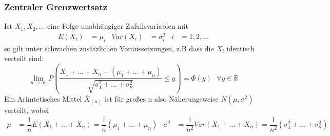 \documentclass[
	ngerman,
	accentcolor=9c,%
	type=intern,
	marginpar=false
	]{tudapub}
\begin{document}
            \subsubsection{Zentraler Grenzwertsatz}
                \begin{satz}
                    Ist $X_1,X_2,\dots$ eine Folge unabhängiger  Zufallsvariablen mit 
                    \begin{align*}
                        E(X_i) &= \mu_i & Var(X_i) &= \sigma_i^2 & i&= 1,2,\dots
                    \end{align*}
                    so gilt unter schwachen zusätzlichen Voraussetzungen, z.B dass die $X_i$ identisch verteilt sind: 
                    \begin{equation*}
                        \lim_{n\rightarrow \infty} P \left(
                            \dfrac{X_1+\dots+X_n- (\mu_1+\dots+\mu_n)}{\sqrt{\sigma_1^2+\dots+\sigma_n^2}}\leq y
                        \right) = \Phi(y) \mbox{ }\forall y \in \mathbb{R}
                    \end{equation*}
                    Ein Arimtetisches Mittel $\bar{X}_{(n)}$ ist für großes n also Näherungsweise $N(\mu, \sigma^2)$ verteilt, wobei
                    \begin{align*}
                        \mu &= \dfrac{1}{n}E(X_1+\dots+X_n) = \dfrac{1}{n}(\mu_1+...+\mu_n) & \sigma^2 &= \dfrac{1}{n^2} Var(X_1+\dots+X_n)= \dfrac{1}{n^2}(\sigma_1^2+\dots+\sigma_n^2) 
                    \end{align*}
                \end{satz}
                \setcounter{satz}{3}
\end{document}
